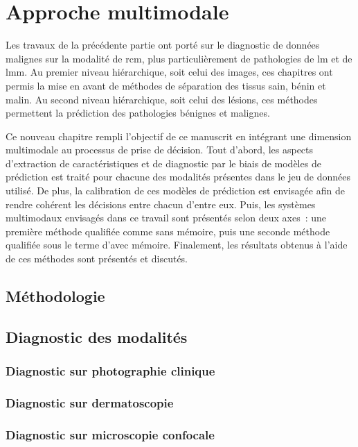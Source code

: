 \renewcommand{\thechapter}{\arabic{chapter}}
\setcounter{chapter}{6}

\chapter{Approche multimodale}
\label{chap:chapter_7}
\chapterintro
Les travaux de la précédente partie ont porté sur le diagnostic de données malignes sur la modalité de \acrlong{rcm}, plus particulièrement de pathologies de \acrlong{lm} et de \acrlong{lmm}. Au premier niveau hiérarchique, soit celui des images, ces chapitres ont permis la mise en avant de méthodes de séparation des tissus sain, bénin et malin. Au second niveau hiérarchique, soit celui des lésions, ces méthodes permettent la prédiction des pathologies bénignes et malignes.\par

Ce nouveau chapitre rempli l'objectif de ce manuscrit en intégrant une dimension multimodale au processus de prise de décision. Tout d'abord, les aspects d'extraction de caractéristiques et de diagnostic par le biais de modèles de prédiction est traité pour chacune des modalités présentes dans le jeu de données utilisé. De plus, la calibration de ces modèles de prédiction est envisagée afin de rendre cohérent les décisions entre chacun d’entre eux. Puis, les systèmes multimodaux envisagés dans ce travail sont présentés selon deux axes~: une première méthode qualifiée comme sans mémoire, puis une seconde méthode qualifiée sous le terme d’avec mémoire. Finalement, les résultats obtenus à l'aide de ces méthodes sont présentés et discutés.\par
\newpage

\section{Méthodologie}
\section{Diagnostic des modalités}
\subsection{Diagnostic sur photographie clinique}
\subsection{Diagnostic sur dermatoscopie}
\subsection{Diagnostic sur microscopie confocale}
\clearpage

